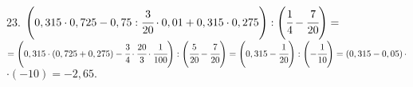 23. $\left(0,315\cdot0,725-0,75:\cfrac{3}{20}\cdot0,01+0,315\cdot0,275\right):\left(\cfrac{1}{4}-\cfrac{7}{20}\right)=$\\$=
\left(0,315\cdot(0,725+0,275)-\cfrac{3}{4}\cdot\cfrac{20}{3}\cdot\cfrac{1}{100}\right):\left(\cfrac{5}{20}-\cfrac{7}{20}\right)=
\left(0,315-\cfrac{1}{20}\right):\left(-\cfrac{1}{10}\right)=\left(0,315-0,05\right)\cdot$\\$\cdot\left(-10\right)=-2,65.$\\
